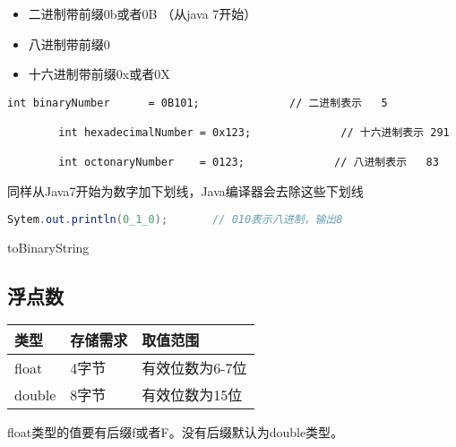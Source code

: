 \begin{itemize}
    \item   二进制带前缀0b或者0B （从java 7开始）
    \item   八进制带前缀0
    \item   十六进制带前缀0x或者0X
\end{itemize}


\begin{lstlisting}[style=cjava]
        int binaryNumber      = 0B101;              // 二进制表示   5 

        int hexadecimalNumber = 0x123;              // 十六进制表示 291   

        int octonaryNumber    = 0123;              // 八进制表示   83
\end{lstlisting}



同样从Java7开始为数字加下划线，Java编译器会去除这些下划线

\begin{lstlisting}[language=java]
        Sytem.out.println(0_1_0);       // 010表示八进制，输出8
\end{lstlisting}


toBinaryString




\subsection{浮点数}


\renewcommand\arraystretch{2}
\begin{tabular}{l|l|l}
    类型         &      存储需求        &     取值范围        \\               \hline
    float        &       4字节          & 有效位数为6-7位      \\
    double      &       8字节          & 有效位数为15位       \\
\end{tabular}\newline


float类型的值要有后缀f或者F。没有后缀默认为double类型。

